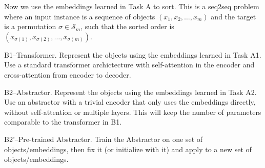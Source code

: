 \documentclass[12pt,pdftex,noinfoline]{imsart}
\def\S{{\mathcal{S}}}
\begin{document}
Now we use the embeddings learned in Task A to sort. This is a seq2seq problem where an input instance is a sequence of objects $(x_1,x_2,\ldots, x_m)$ and the target is a permutation $\sigma \in \S_m$, such that the sorted order 
is $(x_{\sigma(1)}, x_{\sigma(2)}, \ldots, x_{\sigma(m)})$.


B1--Transformer. Represent the objects using the embeddings learned in Task A1. Use a standard transformer 
archictecture with self-attention in the encoder and cross-attention from encoder to decoder. 

B2--Abstractor. Represent the objects using the embeddings learned in Task A2. Use an abstractor 
with a trivial encoder that only uses the embeddings directly, without self-attention or multiple layers. 
This will keep the number of parameters comparable to the transformer in B1.

B2'--Pre-trained Abstractor. Train the Abstractor on one set of objects/embeddings, then fix it (or initialize with it) and apply to a new set of objects/embeddings.
\end{document}
